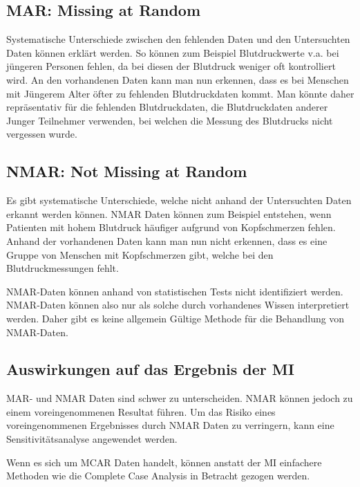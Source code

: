 \subsection{MAR: Missing at Random}

Systematische Unterschiede zwischen den fehlenden Daten und den Untersuchten Daten können erklärt 
werden. So können zum Beispiel Blutdruckwerte v.a. bei jüngeren Personen fehlen, da bei diesen 
der Blutdruck weniger oft kontrolliert wird. \autocite[157]{Sterne2009} An den vorhandenen Daten 
kann man nun erkennen, dass es bei Menschen mit Jüngerem Alter öfter zu fehlenden Blutdruckdaten 
kommt. Man könnte daher repräsentativ für die fehlenden Blutdruckdaten, die Blutdruckdaten anderer 
Junger Teilnehmer verwenden, bei welchen die Messung des Blutdrucks nicht vergessen wurde. 

\subsection{NMAR: Not Missing at Random}

Es gibt systematische Unterschiede, welche nicht anhand der Untersuchten Daten erkannt werden 
können. NMAR Daten können zum Beispiel entstehen, wenn Patienten mit hohem Blutdruck häufiger 
aufgrund von Kopfschmerzen fehlen. \autocite[157]{Sterne2009} Anhand der vorhandenen Daten kann
 man nun nicht erkennen, dass es eine Gruppe von Menschen mit Kopfschmerzen gibt, welche bei den 
 Blutdruckmessungen fehlt. 

NMAR-Daten können anhand von statistischen Tests nicht identifiziert werden. NMAR-Daten können 
also nur als solche durch vorhandenes Wissen interpretiert werden. Daher gibt es keine allgemein 
Gültige Methode für die Behandlung von NMAR-Daten. \autocite[1088]{Donders2006}

\subsection{Auswirkungen auf das Ergebnis der MI}

MAR- und NMAR Daten sind schwer zu unterscheiden. NMAR können jedoch zu einem voreingenommenen Resultat führen. Um das 
Risiko eines voreingenommenen Ergebnisses durch NMAR Daten zu verringern, kann eine Sensitivitätsanalyse angewendet 
werden. \autocite[157]{Sterne2009} 

Wenn es sich um MCAR Daten handelt, können anstatt der MI einfachere Methoden wie die Complete Case Analysis in Betracht 
gezogen werden. \autocite*[1088]{Donders2006} 

